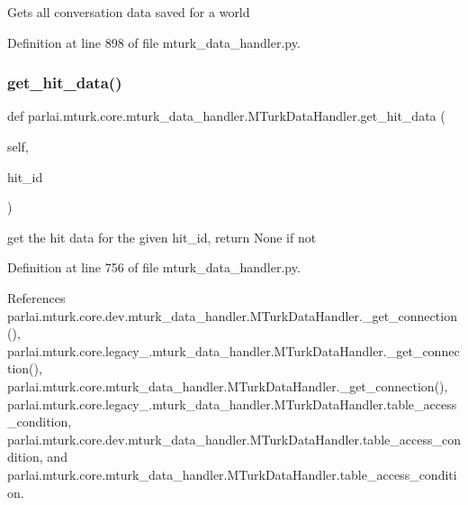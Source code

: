 \begin{DoxyVerb}Gets all conversation data saved for a world\end{DoxyVerb}
 

Definition at line 898 of file mturk\+\_\+data\+\_\+handler.\+py.

\mbox{\label{classparlai_1_1mturk_1_1core_1_1mturk__data__handler_1_1MTurkDataHandler_a753c4a107539e6085fb2fd8402ed35e2}} 
\subsubsection{\texorpdfstring{get\+\_\+hit\+\_\+data()}{get\_hit\_data()}}
{\footnotesize\ttfamily def parlai.\+mturk.\+core.\+mturk\+\_\+data\+\_\+handler.\+M\+Turk\+Data\+Handler.\+get\+\_\+hit\+\_\+data (\begin{DoxyParamCaption}\item[{}]{self,  }\item[{}]{hit\+\_\+id }\end{DoxyParamCaption})}

\begin{DoxyVerb}get the hit data for the given hit_id, return None if not\end{DoxyVerb}
 

Definition at line 756 of file mturk\+\_\+data\+\_\+handler.\+py.



References parlai.\+mturk.\+core.\+dev.\+mturk\+\_\+data\+\_\+handler.\+M\+Turk\+Data\+Handler.\+\_\+get\+\_\+connection(), parlai.\+mturk.\+core.\+legacy\+\_.\+mturk\+\_\+data\+\_\+handler.\+M\+Turk\+Data\+Handler.\+\_\+get\+\_\+connection(), parlai.\+mturk.\+core.\+mturk\+\_\+data\+\_\+handler.\+M\+Turk\+Data\+Handler.\+\_\+get\+\_\+connection(), parlai.\+mturk.\+core.\+legacy\+\_.\+mturk\+\_\+data\+\_\+handler.\+M\+Turk\+Data\+Handler.\+table\+\_\+access\+\_\+condition, parlai.\+mturk.\+core.\+dev.\+mturk\+\_\+data\+\_\+handler.\+M\+Turk\+Data\+Handler.\+table\+\_\+access\+\_\+condition, and parlai.\+mturk.\+core.\+mturk\+\_\+data\+\_\+handler.\+M\+Turk\+Data\+Handler.\+table\+\_\+access\+\_\+condition.

